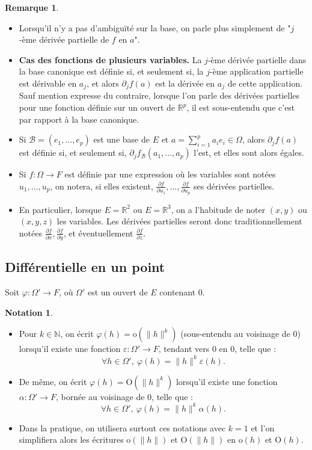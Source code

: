 \documentclass[french]{article}
\newcommand{\N}{\mathbb{N}}
\newcommand{\R}{\mathbb{R}}
\renewcommand{\o}{\text{o}}
\renewcommand{\O}{\text{O}}
\theoremstyle{plain}
\theoremstyle{definition}
\newtheorem*{rmq}{Remarque}
\newtheorem*{notation}{Notation}
\theoremstyle{remark}
\begin{document}
\begin{rmq}
	\begin{itemize}
		\item Lorsqu'il n'y a pas d'ambiguïté sur la base, on parle plus simplement de "$j$-ème dérivée partielle de $f$ en $a$".
		\item \textbf{Cas des fonctions de plusieurs variables.} La $j$-ème dérivée partielle dans la base canonique est définie si, et seulement si, la $j$-ème application partielle est dérivable en $a_j$, et alors $\partial_jf(a)$ est la dérivée en $a_j$ de cette application.\\
		Sauf mention expresse du contraire, lorsque l'on parle des dérivées partielles pour une fonction définie sur un ouvert de $\R^p$, il est sous-entendu que c'est par rapport à la base canonique.
		\item Si $\mathcal{B}=(e_1,\ldots,e_p)$ est une base de $E$ et $a=\displaystyle\sum_{i=1}^{p}a_ie_i\in\Omega$, alors $\partial_jf(a)$ est définie si, et seulement si, $\partial_jf_{\mathcal{B}}(a_1,\ldots,a_p)$ l'est, et elles sont alors égales.
		\item Si $f:\Omega\to F$ est définie par une expression où les variables sont notées $u_1,\ldots,u_p$, on notera, si elles existent, $\displaystyle\frac{\partial f}{\partial u_1},\ldots,\frac{\partial f}{\partial u_p}$ ses dérivées partielles.
		\item En particulier, lorsque $E=\R^2$ ou $E=\R^3$, on a l'habitude de noter $(x,y)$ ou $(x,y,z)$ les variables. Les dérivées partielles seront donc traditionnellement notées $\displaystyle\frac{\partial f}{\partial x},\frac{\partial f}{\partial y}$, et éventuellement $\displaystyle\frac{\partial f}{\partial z}$.
	\end{itemize}
\end{rmq}

\subsection{Différentielle en un point}
Soit $\varphi:\Omega'\to F$, où $\Omega'$ est un ouvert de $E$ contenant $0$.

\begin{notation}
	\begin{itemize}
		\item Pour $k\in\N$, on écrit $\varphi(h)=\o(\lVert h\rVert^k)$ (sous-entendu au voisinage de $0$) lorsqu'il existe une fonction $\varepsilon:\Omega'\to F$, tendant vers $0$ en $0$, telle que : 
		$$\forall h\in\Omega',\ \varphi(h)=\lVert h\rVert^k\varepsilon(h).$$
		\item De même, on écrit $\varphi(h)=\O(\lVert h\rVert^k)$ lorsqu'il existe une fonction $\alpha:\Omega'\to F$, bornée au voisinage de $0$, telle que : 
		$$\forall h\in\Omega',\ \varphi(h)=\lVert h\rVert^k\alpha(h).$$
		\item Dans la pratique, on utilisera surtout ces notations avec $k=1$ et l'on simplifiera alors les écritures $\o(\lVert h\rVert)$ et $\O(\lVert h\rVert)$ en $\o(h)$ et $\O(h)$.
	\end{itemize}
\end{notation}
\end{document}
